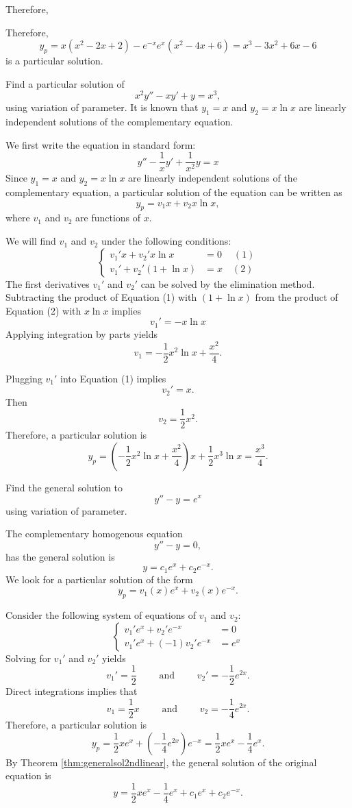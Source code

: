 \begin{solution}
  Therefore,
  
  Therefore,
  \[y_p=x(x^2-2x+2)-e^{-x}e^x(x^2-4x+6)=x^3-3x^2+6x-6\]
  is a particular solution.
\end{solution}

\begin{exercise}
Find a particular solution of
\[x^2 y'' -  x y' + y =x^3,\]
using variation of parameter. It is known that  $y_1 = x$ and $y_2=x\ln x$ are linearly independent solutions of the complementary equation.\\
\end{exercise}
\begin{exersol}
We first write the equation in standard form:
\[y''-\frac{1}{x}y'+\frac{1}{x^2}y=x\]
Since $y_1 = x$ and $y_2=x\ln x$ are linearly independent solutions of the complementary equation, a particular solution of the equation can be written as
\[y_p=v_1x+v_2x\ln x,\]
where $v_1$ and $v_2$ are functions of $x$.

We will find $v_1$ and $v_2$ under the following conditions:
\[
  \begin{cases}
v_1'x+v_2'x\ln x &=0 ~\quad (1)\\
v_1'+v_2'(1+\ln x) &=x \quad (2)
\end{cases}
\] 
The first derivatives $v_1'$ and $v_2'$ can be solved by the elimination method.
Subtracting the product of Equation (1) with $(1+\ln x)$ from the product of Equation (2) with $x\ln x$ implies
\[v_1'=-x\ln x\]
Applying integration by parts yields 
\[v_1=-\frac{1}{2}x^2\ln x+\frac{x^2}{4}.\]

Plugging $v_1'$ into Equation (1) implies
\[v_2'=x.\]
Then 
\[v_2=\frac12x^2.\]
Therefore, a particular solution is
\[y_p=(-\frac{1}{2}x^2\ln x+\frac{x^2}{4})x+\frac{1}{2}x^3\ln x=\frac{x^3}{4}.\]
\end{exersol}

\begin{exercise}
  Find the general solution to
  \[  y'' -  y =  e^x\]
  using variation of parameter.
\end{exercise}
\begin{exersol}
The complementary homogenous equation 
\[y'' -  y =  0,\]
has the general solution is
\[y= {c_1} e^x + {c_2}e^{-x}.\]
We look for a particular solution of the form \[y_p={v_1(x)}e^x+{v_2(x)}e^{-x}.\]

Consider the following system of equations of $v_1$ and $v_2$:
\[
  \begin{cases}
v_1'e^x+v_2'e^{-x}&=0\\
v_1'e^x+(-1)v_2'e^{-x}&=e^x
\end{cases}
\]
Solving for $v_1'$ and $v_2'$ yields
\[v_1'=\frac{1}{2} \qquad\text{ and }\qquad v_2'=-\frac{1}{2}e^{2x}.\]
Direct integrations implies that 
\[v_1=\frac{1}{2}x \qquad\text{ and }\qquad v_2=-\frac{1}{4}e^{2x}.\]
Therefore, a particular solution is
\[y_p=\frac{1}{2}xe^x+(-\frac{1}{4}e^{2x})e^{-x}=\frac{1}{2}xe^x-\frac{1}{4}e^{x}.\]
By Theorem \ref{thm:generalsol2ndlinear}, the general solution of the original equation is
\[y= \frac{1}{2}xe^x-\frac{1}{4}e^{x}+ c_1 e^x + c_2 e^{-x}.\]
\end{exersol}


